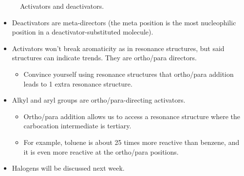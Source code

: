 \documentclass[../notes.tex]{subfiles}
\begin{document}
\begin{itemize}
\begin{figure}[h!]
        \caption{Activators and deactivators.}
        \label{fig:DeActivators}
    \end{figure}
    \begin{itemize}
        \item Deactivators are meta-directors (the meta position is the most nucleophilic position in a deactivator-substituted molecule).
        \item Activators won't break aromaticity as in resonance structures, but said structures can indicate trends. They are ortho/para directors.
        \begin{itemize}
            \item Convince yourself using resonance structures that ortho/para addition leads to 1 extra resonance structure.
        \end{itemize}
        \item Alkyl and aryl groups are ortho/para-directing activators.
        \begin{itemize}
            \item Ortho/para addition allows us to access a resonance structure where the carbocation intermediate is tertiary.
            \item For example, toluene is about 25 times more reactive than benzene, and it is even more reactive at the ortho/para positions.
        \end{itemize}
        \item Halogens will be discussed next week.
    \end{itemize}
\end{itemize}
\end{document}
